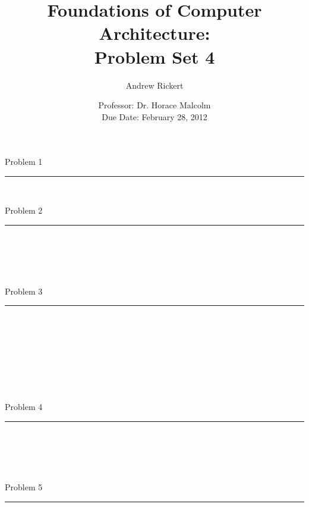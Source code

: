 \documentclass[11pt,reqno]{article}
\title{Foundations of Computer Architecture: \\ Problem Set 4 }
\author{Andrew Rickert}
\date{Professor: Dr. Horace Malcolm \\ \hspace{-19pt} Due Date: February 28,  2012}                                           %
\begin{document}
\maketitle


\begin{flushleft} 
Problem 1 \\
\rule{500pt}{1pt}\\
\end{flushleft} 

\begin{flushleft} 
Problem 2 \\
\rule{500pt}{1pt}\\
\end{flushleft} 

\noindent{}\\ 

\noindent{}\\ 

\begin{flushleft} 
Problem 3 \\
\rule{500pt}{1pt}\\
\end{flushleft} 

\noindent{}\\ 

\noindent{}\\ 

\noindent{}\\ 

\noindent{}\\ 

\noindent{}\\ 

\begin{flushleft} 
Problem 4 \\
\rule{500pt}{1pt}\\
\end{flushleft} 

\noindent{}\\ 

\noindent{}\\ 

\begin{flushleft} 
Problem 5 \\
\rule{500pt}{1pt}\\
\end{flushleft} 

\noindent{}\\ 

\noindent{}\\ 

\noindent{}\\ 

\noindent{}\\ 
\end{document}
